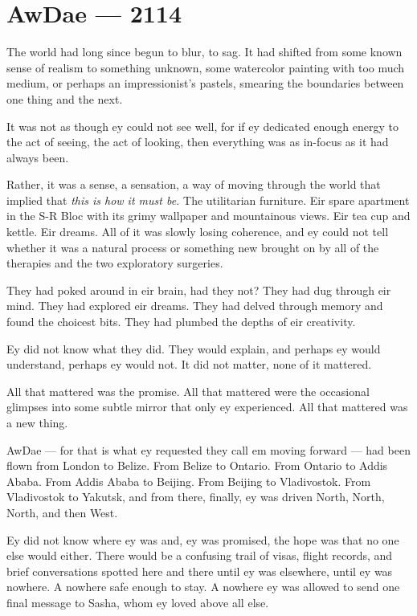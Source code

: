 \hypertarget{awdae-2114}{%
\chapter{AwDae — 2114}\label{awdae-2114}}

The world had long since begun to blur, to sag. It had shifted from some known sense of realism to something unknown, some watercolor painting with too much medium, or perhaps an impressionist's pastels, smearing the boundaries between one thing and the next.

It was not as though ey could not see well, for if ey dedicated enough energy to the act of seeing, the act of looking, then everything was as in-focus as it had always been.

Rather, it was a sense, a sensation, a way of moving through the world that implied that \emph{this is how it must be.} The utilitarian furniture. Eir spare apartment in the S-R Bloc with its grimy wallpaper and mountainous views. Eir tea cup and kettle. Eir dreams. All of it was slowly losing coherence, and ey could not tell whether it was a natural process or something new brought on by all of the therapies and the two exploratory surgeries.

They had poked around in eir brain, had they not? They had dug through eir mind. They had explored eir dreams. They had delved through memory and found the choicest bits. They had plumbed the depths of eir creativity.

Ey did not know what they did. They would explain, and perhaps ey would understand, perhaps ey would not. It did not matter, none of it mattered.

All that mattered was the promise. All that mattered were the occasional glimpses into some subtle mirror that only ey experienced. All that mattered was a new thing.

AwDae — for that is what ey requested they call em moving forward — had been flown from London to Belize. From Belize to Ontario. From Ontario to Addis Ababa. From Addis Ababa to Beijing. From Beijing to Vladivostok. From Vladivostok to Yakutsk, and from there, finally, ey was driven North, North, North, and then West.

Ey did not know where ey was and, ey was promised, the hope was that no one else would either. There would be a confusing trail of visas, flight records, and brief conversations spotted here and there until ey was elsewhere, until ey was nowhere. A nowhere safe enough to stay. A nowhere ey was allowed to send one final message to Sasha, whom ey loved above all else.

